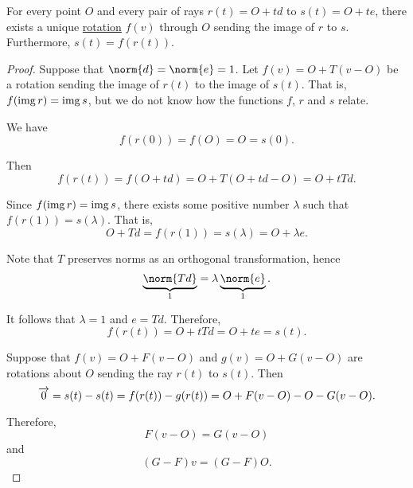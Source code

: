 \begin{proposition}\label{thm:plane_ray_rotation}
  For every point \( O \) and every pair of rays \( r(t) = O + td \) to \( s(t) = O + te \), there exists a unique \hyperref[def:rigid_motion/rotation]{rotation} \( f(v) \) through \( O \) sending the image of \( r \) to \( s \). Furthermore, \( s(t) = f(r(t)) \).
\end{proposition}
\begin{proof}
   Suppose that \( \norm{d} = \norm{e} = 1 \). Let \( f(v) = O + T(v - O) \) be a rotation sending the image of \( r(t) \) to the image of \( s(t) \). That is, \( f(\operatorname{img} r) = \operatorname{img} s \), but we do not know how the functions \( f \), \( r \) and \( s \) relate.

  We have
  \begin{equation*}
    f(r(0)) = f(O) = O = s(0).
  \end{equation*}

  Then
  \begin{equation*}
    f(r(t)) = f(O + td) = O + T(O + td - O) = O + t Td.
  \end{equation*}

  Since \( f(\operatorname{img} r) = \operatorname{img} s \), there exists some positive number \( \lambda \) such that \( f(r(1)) = s(\lambda) \). That is,
  \begin{equation*}
    O + Td = f(r(1)) = s(\lambda) = O + \lambda e.
  \end{equation*}

  Note that \( T \) preserves norms as an orthogonal transformation, hence
  \begin{equation*}
    \underbrace{\norm{Td}}_{1} = \lambda \underbrace{\norm{e}}_{1}.
  \end{equation*}

  It follows that \( \lambda = 1 \) and \( e = Td \). Therefore,
  \begin{equation*}
    f(r(t)) = O + t Td = O + te = s(t).
  \end{equation*}

  \UniquenessSubProof Suppose that \( f(v) = O + F(v - O) \) and \( g(v) = O + G(v - O) \) are rotations about \( O \) sending the ray \( r(t) \) to \( s(t) \). Then
  \begin{equation*}
    \overrightarrow{0} = s(t) - s(t) = f(r(t)) - g(r(t)) = O + F(v - O) - O - G(v - O).
  \end{equation*}

  Therefore,
  \begin{equation*}
    F(v - O) = G(v - O)
  \end{equation*}
  and
  \begin{equation*}
    (G - F) v = (G - F) O.
  \end{equation*}


\end{proof}
